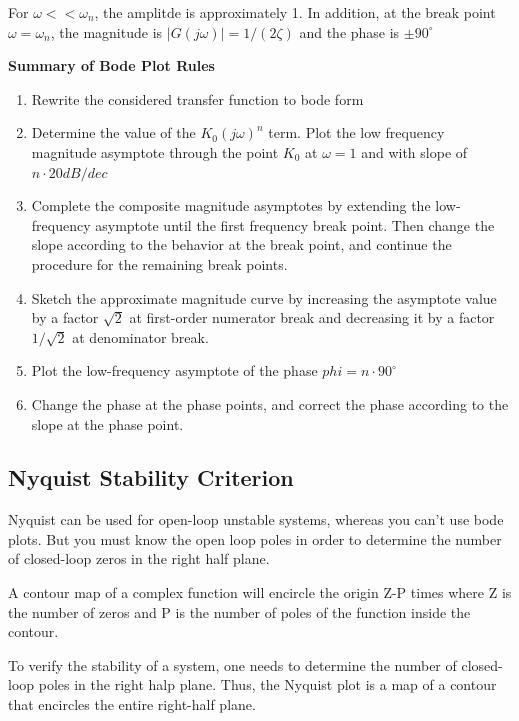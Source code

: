 For $\omega << \omega_n$, the amplitde is approximately 1.
In addition, at the break point $\omega = \omega_n$, the magnitude is $|G(j\omega)| = 1/(2\zeta)$
and the phase is $\pm90^{\circ}$


\textbf{Summary of Bode Plot Rules}

\begin{enumerate}
	\item{Rewrite the considered transfer function to bode form}
	\item{Determine the value of the $K_0(j\omega)^n$ term. Plot the low frequency magnitude
	            asymptote through the point $K_0$ at $\omega = 1$ and with slope of $n \cdot 20 dB/dec$}
	\item{Complete the composite magnitude asymptotes by extending the low-frequency
	            asymptote until the first frequency break point. Then change the slope according to
	            the behavior at the break point, and continue the procedure for the remaining break points.}
	\item{Sketch the approximate magnitude curve by increasing the asymptote value by a factor $\sqrt{2}$ at first-order numerator
	            break and decreasing it by a factor $1/\sqrt{2}$ at denominator break.}
	\item{Plot the low-frequency asymptote  of the phase $phi=n \cdot 90^{\circ}$}
	\item{Change the phase at the phase points, and correct the phase according to the slope
	            at the phase point.}
\end{enumerate}

\subsection{Nyquist Stability Criterion}

Nyquist can be used for open-loop unstable systems, whereas you can't use bode plots.
But you must know the open loop poles in order to determine the number of
closed-loop zeros in the right half plane.


A contour map of a complex function will encircle the origin Z-P times where Z is the number
of zeros and P is the number of poles of the function inside the contour.

To verify the stability of a system, one needs to determine the number of closed-loop poles
in the right halp plane. Thus, the Nyquist plot is a map of a contour that encircles
the entire right-half plane.

